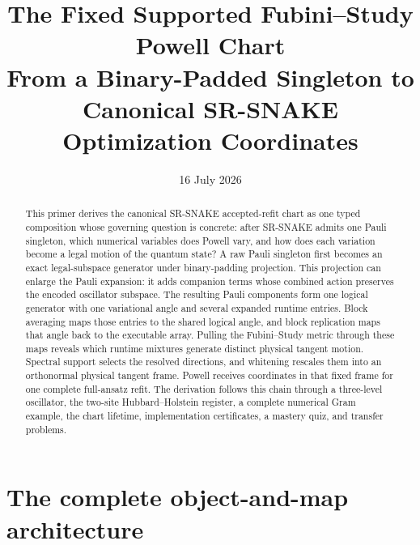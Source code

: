 \documentclass[10pt,twocolumn]{article}
\title{The Fixed Supported Fubini--Study Powell Chart\\
\large From a Binary-Padded Singleton to Canonical SR-SNAKE Optimization Coordinates}
\author{}
\date{16 July 2026}
\begin{document}
\maketitle
\vspace{-1.45em}

\begin{abstract}
This primer derives the canonical SR-SNAKE accepted-refit chart as one typed
composition whose governing question is concrete: after SR-SNAKE admits one
Pauli singleton, which numerical variables does Powell vary, and how does each
variation become a legal motion of the quantum state? A raw Pauli singleton
first becomes an exact legal-subspace generator under binary-padding
projection. This projection can enlarge the Pauli expansion: it adds companion
terms whose combined action preserves the encoded oscillator subspace. The
resulting Pauli components form one logical generator with one variational
angle and several expanded runtime entries. Block averaging maps those entries
to the shared logical angle, and block replication maps that angle back to the
executable array. Pulling the Fubini--Study metric through these maps reveals
which runtime mixtures generate distinct physical tangent motion. Spectral
support selects the resolved directions, and whitening rescales them into an
orthonormal physical tangent frame. Powell receives coordinates in that fixed
frame for one complete full-ansatz refit. The derivation follows this chain
through a three-level oscillator, the two-site Hubbard--Holstein register, a
complete numerical Gram example, the chart lifetime, implementation
certificates, a mastery quiz, and transfer problems.
\end{abstract}

\section*{The complete object-and-map architecture}
\end{document}
